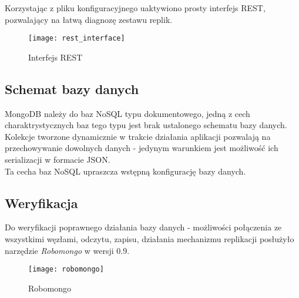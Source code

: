 Korzystając z pliku konfiguracyjnego uaktywiono prosty interfejs REST, pozwalający na łatwą diagnozę zestawu replik.

\begin{figure}[H]
	\centering
	\texttt{[image: rest\_interface]}
	\caption{Interfejs REST}
\end{figure}

\subsection{Schemat bazy danych}
MongoDB należy do baz NoSQL typu dokumentowego, jedną z cech charaktrystycznych baz tego typu jest brak ustalonego schematu bazy danych. Kolekcje tworzone dynamicznie w trakcie działania aplikacji pozwalają na przechowywanie dowolnych danych - jedynym warunkiem jest możliwość ich serializacji w formacie JSON. \\
Ta cecha baz NoSQL upraszcza wstępną konfigurację bazy danych.

\subsection{Weryfikacja}
Do weryfikacji poprawnego działania bazy danych - możliwości połączenia ze wszystkimi węzłami, odczytu, zapisu, działania mechanizmu replikacji posłużyło narzędzie \textit{Robomongo} w wersji 0.9.

\begin{figure}[H]
	\centering
	\texttt{[image: robomongo]}
	\caption{Robomongo}
\end{figure}